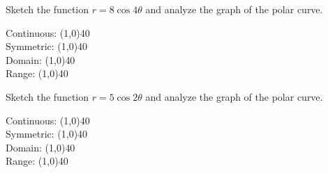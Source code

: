 \documentclass[../main.tex]{subfiles}
\begin{document}
\begin{questions}
    \question[1] Sketch the function $r = 8\cos4\theta$ and analyze the graph of the polar curve.
    
        \begin{left} 
        \end{left}
    
    Continuous: \line(1,0){40} \\
    \newline
    Symmetric: \line(1,0){40} \\
    \newline
    Domain: \line(1,0){40} \\
    \newline
    Range: \line(1,0){40} \\
    
    \newpage
    \question[1] Sketch the function $r = 5\cos2\theta$ and analyze the graph of the polar curve.
    
        \begin{left} 
        \end{left}
    
    Continuous: \line(1,0){40} \\
    \newline
    Symmetric: \line(1,0){40} \\
    \newline
    Domain: \line(1,0){40} \\
    \newline
    Range: \line(1,0){40} \\
    \end{questions}
\end{document}
